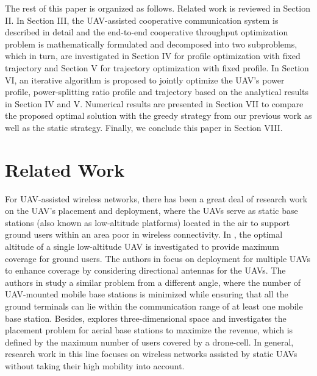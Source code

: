 \documentclass[12pt, draftclsnofoot, onecolumn]{IEEEtran}
\begin{document}
The rest of this paper is organized as follows. Related work is reviewed in Section II. In Section III, the UAV-assisted cooperative communication system is described in detail and the end-to-end cooperative throughput optimization problem is mathematically formulated and decomposed into two subproblems, which in turn, are investigated in Section IV for profile optimization with fixed trajectory and Section V for trajectory optimization with fixed profile. In Section VI, an iterative algorithm is proposed to jointly optimize  the UAV's power profile, power-splitting ratio profile and trajectory based on the analytical results in Section IV and V. Numerical results are presented in Section VII to compare the proposed optimal solution with the greedy strategy from our previous work as well as the static strategy. Finally, we conclude this paper in Section VIII.


\section{Related Work}

For UAV-assisted wireless networks, there has been a great deal of research work on the UAV's placement and deployment, where the UAVs serve as static base stations (also known as low-altitude platforms) located in the air to support ground users within an area poor in wireless connectivity. In \cite{6863654}, the optimal altitude of a single low-altitude UAV is investigated to provide maximum coverage for ground users. The authors in \cite{7486987} focus on deployment for multiple UAVs to enhance coverage by considering directional antennas for the UAVs. The authors in \cite{7762053} study a similar problem from a different angle, where the number of UAV-mounted mobile base stations is minimized while ensuring that all the ground terminals can lie within the communication range of at least one mobile base station. Besides, \cite{7510820} explores three-dimensional space and investigates the placement problem for aerial base stations to maximize the revenue, which is defined by the maximum number of users covered by a drone-cell. In general, research work in this line focuses on wireless networks assisted by static UAVs without taking their high mobility into account.
\end{document}
